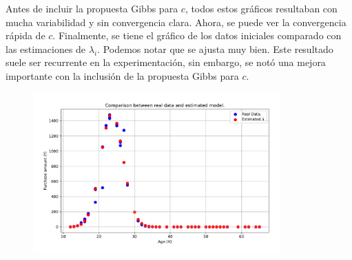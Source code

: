 Antes de incluir la propuesta Gibbs para $c$, todos estos gráficos resultaban con mucha variabilidad y sin convergencia clara. Ahora, se puede ver la convergencia rápida de $c$. Finalmente, se tiene el gráfico de los datos iniciales comparado con las estimaciones de $\lambda_{i}$. Podemos notar que se ajusta muy bien. Este resultado suele ser recurrente en la experimentación, sin embargo, se notó una mejora importante con la inclusión de la propuesta Gibbs para $c$.
\begin{figure}[h!]
	\centering
	\includegraphics[width=0.845\textwidth]{IMAGENES/comparision_ex2.pdf}
\end{figure}